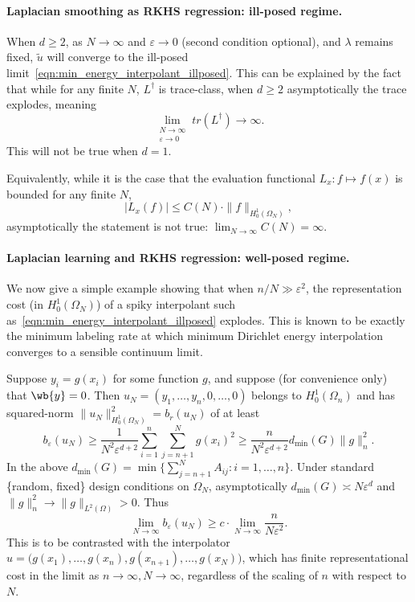 \documentclass{article}
\newcommand{\1}{\mathbf{1}}
\newcommand{\Leb}{L}
\newcommand{\wt}[1]{\widetilde{#1}}
\theoremstyle{definition}
\theoremstyle{remark}
\begin{document}
\paragraph{Laplacian smoothing as RKHS regression: ill-posed regime.}
When $d \geq 2$, as $N \to \infty$ and $\varepsilon \to 0$ (second condition optional), and $\lambda$ remains fixed, $\wt{u}$ will converge to the ill-posed limit~\eqref{eqn:min_energy_interpolant_illposed}. This can be explained by the fact that while for any finite $N$, $L^{\dagger}$ is trace-class, when $d \geq 2$ asymptotically the trace explodes, meaning
\begin{equation*}
\lim_{\substack{N \to \infty \\ \varepsilon \to 0}} tr(L^{\dagger}) \to \infty.
\end{equation*}
This will not be true when $d = 1$. 

Equivalently, while it is the case that the evaluation functional $L_x: f \mapsto f(x)$ is bounded for any finite $N$,
\begin{equation*}
|L_x(f)| \leq C(N) \cdot \|f\|_{H_0^1(\Omega_N)},
\end{equation*}
asymptotically the statement is not true: $\lim_{N \to \infty} C(N) = \infty$.

\paragraph{Laplacian learning and RKHS regression: well-posed regime.}
We now give a simple example showing that when $n/N \gg \varepsilon^2$, the representation cost (in $H_0^1(\Omega_N)$) of a spiky interpolant such as~\eqref{eqn:min_energy_interpolant_illposed} explodes. This is known to be exactly the minimum labeling rate at which minimum Dirichlet energy interpolation converges to a sensible continuum limit. 

Suppose $y_i = g(x_i)$ for some function $g$, and suppose (for convenience only) that $\wb{y} = 0$. Then $u_N = (y_1,\ldots,y_n, 0,\ldots,0)$ belongs to $H_0^1(\Omega_n)$ and has squared-norm $\|u_N\|_{H_0^1(\Omega_N)}^2 = b_r(u_N)$ of at least
\begin{equation*}
b_{\varepsilon}(u_N) \geq \frac{1}{N^2 \varepsilon^{d + 2}} \sum_{i = 1}^{n} \sum_{j = n + 1}^{N} g(x_i)^2 \geq \frac{n}{N^2 \varepsilon^{d + 2}} d_{\min}(G) \|g\|_n^2.
\end{equation*} 
In the above $d_{\min}(G) = \min\bigl\{\sum_{j = n + 1}^{N} A_{ij}: i = 1,\ldots,n\bigr\}$. Under standard \{random, fixed\} design conditions on $\Omega_N$, asymptotically $d_{\min}(G) \asymp N\varepsilon^d$ and $\|g\|_n^2 \to \|g\|_{\Leb^2(\Omega)} > 0$. Thus
\begin{equation*}
\lim_{N \to \infty} b_{\varepsilon}(u_N) \geq c \cdot \lim_{N \to \infty} \frac{n}{N \varepsilon^2}.
\end{equation*}
This is to be contrasted with the interpolator $u = \bigl(g(x_1),\ldots,g(x_n), g(x_{n + 1}),\ldots,g(x_N)\bigr)$, which has finite representational cost in the limit as $n \to \infty, N \to \infty$, regardless of the scaling of $n$ with respect to $N$.
\end{document}
